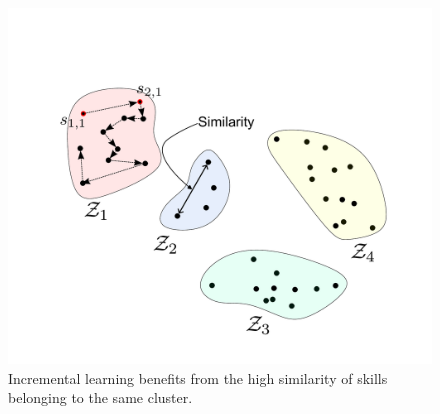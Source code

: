 \begin{figure}[!t]
	\centering
	\includegraphics[width=0.9\columnwidth]{fig/skill_similarity.pdf}
	\caption{Incremental learning benefits from the high similarity of skills belonging to the same cluster.}
	\label{fig:incremental_transfer_similarity}
\end{figure}
